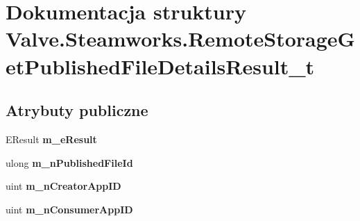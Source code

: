 \hypertarget{struct_valve_1_1_steamworks_1_1_remote_storage_get_published_file_details_result__t}{}\section{Dokumentacja struktury Valve.\+Steamworks.\+Remote\+Storage\+Get\+Published\+File\+Details\+Result\+\_\+t}
\label{struct_valve_1_1_steamworks_1_1_remote_storage_get_published_file_details_result__t}
\subsection*{Atrybuty publiczne}
\begin{DoxyCompactItemize}
\item 
\mbox{\label{struct_valve_1_1_steamworks_1_1_remote_storage_get_published_file_details_result__t_af813c4319a6569c55b8e7a731a52433f}} 
E\+Result {\bfseries m\+\_\+e\+Result}
\item 
\mbox{\label{struct_valve_1_1_steamworks_1_1_remote_storage_get_published_file_details_result__t_a6a4dd7187cdeed0f0b35420a77fb6925}} 
ulong {\bfseries m\+\_\+n\+Published\+File\+Id}
\item 
\mbox{\label{struct_valve_1_1_steamworks_1_1_remote_storage_get_published_file_details_result__t_a1af88c390a588b37a8c66b0f724f97b1}} 
uint {\bfseries m\+\_\+n\+Creator\+App\+ID}
\item 
\mbox{\label{struct_valve_1_1_steamworks_1_1_remote_storage_get_published_file_details_result__t_afd59d613175fff7399e25e02f4138bed}} 
uint {\bfseries m\+\_\+n\+Consumer\+App\+ID}
\item 
\mbox{\label{struct_valve_1_1_steamworks_1_1_remote_storage_get_published_file_details_result__t_a9f7785ae61d7b89c20f26e3ffe72db59}} 

\end{DoxyCompactItemize}
